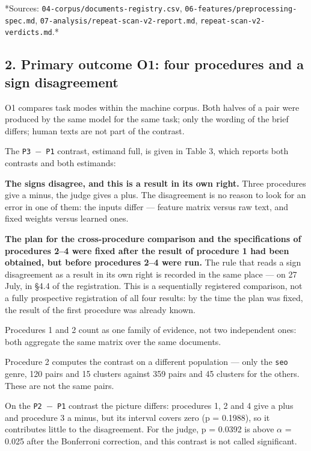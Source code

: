 \documentclass[11pt,a4paper]{article}
\renewcommand{\_}{\textunderscore\allowbreak}
\begin{document}
*Sources: \texttt{04-\allowbreak{}corpus/documents-\allowbreak{}registry.csv}, \texttt{06-\allowbreak{}features/preprocessing-\allowbreak{}spec.md},
\texttt{07-\allowbreak{}analysis/repeat-\allowbreak{}scan-\allowbreak{}v2-\allowbreak{}report.md}, \texttt{repeat-\allowbreak{}scan-\allowbreak{}v2-\allowbreak{}verdicts.md}.*

\subsection{2. Primary outcome O1: four procedures and a sign disagreement}

O1 compares task modes within the machine corpus. Both halves of a pair were
produced by the same model for the same task; only the wording of the brief
differs; human texts are not part of the contrast.

The \texttt{P3 $-$ P1} contrast, estimand full, is given in Table 3, which reports both
contrasts and both estimands:

\setcounter{table}{2}


\textbf{The signs disagree, and this is a result in its own right.} Three
procedures give a minus, the judge gives a plus. The disagreement is no reason
to look for an error in one of them: the inputs differ — feature matrix versus
raw text, and fixed weights versus learned ones.

\textbf{The plan for the cross-procedure comparison and the specifications of
procedures 2–4 were fixed after the result of procedure 1 had been obtained,
but before procedures 2–4 were run.} The rule that reads a sign disagreement
as a result in its own right is recorded in the same place — on 27 July, in
§4.4 of the registration. This is a sequentially registered comparison, not a
fully prospective registration of all four results: by the time the plan was
fixed, the result of the first procedure was already known.

Procedures 1 and 2 count as one family of evidence, not two independent ones:
both aggregate the same matrix over the same documents.

Procedure 2 computes the contrast on a different population — only the \texttt{seo}
genre, 120 pairs and 15 clusters against 359 pairs and 45 clusters for the
others. These are not the same pairs.

On the \texttt{P2 $-$ P1} contrast the picture differs: procedures 1, 2 and 4 give a
plus and procedure 3 a minus, but its interval covers zero (p = 0.1988), so it
contributes little to the disagreement. For the judge, p = 0.0392 is above
$\alpha$ = 0.025 after the Bonferroni correction, and this contrast is not called
significant.
\end{document}
